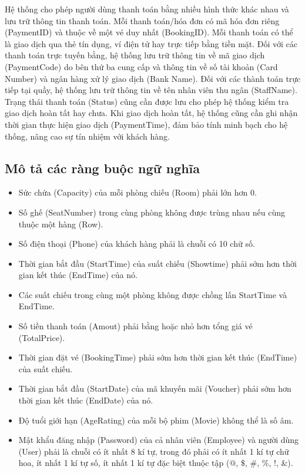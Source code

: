 \documentclass[a4paper]{article}
\begin{document}
Hệ thống cho phép người dùng thanh toán bằng nhiều hình thức khác nhau và lưu trữ thông tin thanh toán. 
Mỗi thanh toán/hóa đơn có mã hóa đơn riêng (PaymentID) và thuộc về một vé duy nhất (BookingID). 
Mỗi thanh toán có thể là giao dịch qua thẻ tín dụng, ví điện tử hay trực tiếp bằng tiền mặt. 
Đối với các thanh toán trực tuyến bằng, hệ thống lưu trữ thông tin về mã giao dịch (PaymentCode) do bên thứ ba cung cấp và thông tin về số tài khoản (Card Number) và ngân hàng xử lý giao dịch (Bank Name). 
Đối với các thành toán trực tiếp tại quầy, hệ thống lưu trữ thông tin về tên nhân viên thu ngân (StaffName). 
Trạng thái thanh toán (Status) cũng cần được lưu cho phép hệ thống kiểm tra giao dịch hoàn tất hay chưa. 
Khi giao dịch hoàn tất, hệ thống cũng cần ghi nhận thời gian thực hiện giao dịch (PaymentTime), đảm bảo tính minh bạch cho hệ thống, nâng cao sự tín nhiệm với khách hàng.


\subsection{Mô tả các ràng buộc ngữ nghĩa}
\begin{itemize}
	\item Sức chứa (Capacity) của mỗi phòng chiếu (Room) phải lớn hơn 0.
	\item Số ghế (SeatNumber) trong cùng phòng không được trùng nhau nếu cùng thuộc một hàng (Row).
	\item Số điện thoại (Phone) của khách hàng phải là chuỗi có 10 chữ số.
	\item Thời gian bắt đầu (StartTime) của suất chiếu (Showtime) phải sớm hơn thời gian kết thúc (EndTime) của nó.
	\item Các suất chiếu trong cùng một phòng không được chồng lấn StartTime và EndTime.
	\item Số tiền thanh toán (Amout) phải bằng hoặc nhỏ hơn tổng giá vé (TotalPrice).
	\item Thời gian đặt vé (BookingTime) phải sớm hơn thời gian kết thúc (EndTime) của suất chiếu.
	\item Thời gian bắt đầu (StartDate) của mã khuyến mãi (Voucher) phải sớm hơn thời gian kết thúc (EndDate) của nó.
	\item Độ tuổi giới hạn (AgeRating) của mỗi bộ phim (Movie) không thể là số âm.
	\item Mật khẩu đăng nhập (Password) của cả nhân viên (Employee) và người dùng (User) phải là chuỗi có ít nhất 8 kí tự, trong đó phải có ít nhất 1 kí tự chữ hoa, ít nhất 1 kí tự số, ít nhất 1 kí tự đặc biệt thuộc tập ($@$, $\mathdollar$, $\#$, $\%$, !, $\&$).
\end{itemize}
\pagebreak
\end{document}
